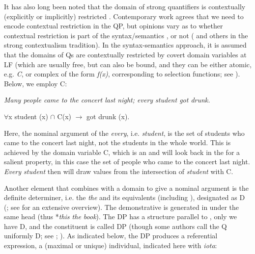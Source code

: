 \documentclass[output=paper,
modfonts
]{langscibook}
\begin{document}
It has also long been noted that the domain of strong quantifiers is contextually (explicitly or implicitly) restricted \citep[see \textit{inter alia}][]{reuland-termeulen1987}. Contemporary work agrees that we need to encode contextual restriction in the QP, but opinions vary as to whether contextual restriction is part of the syntax/semantics \citep{Partee1987, Fintel1994, vonfintel1998, stanley-szabo2000, stanley2002, matthewson2001, marti2003, Giannakidou2004, etxeberria2005, etxeberria2008, etxeberria2009, gillon2006, gillon2009, etxeberria-giannakidou2009, etxeberria-giannakidou2014, giannakidou-rathert2009}, or not (\citealt{recanati1996, recanati2004, recanati2007} and others in the strong contextualism tradition). In the syntax-semantics approach, it is  assumed that the domains of Qs are contextually restricted by covert domain variables at LF (which are usually free, but can also be bound, and they can be  either atomic, e.g. \textit{C}, or complex of the form \textit{f(x)}, corresponding to selection functions; see \citealt{vonfintel1998,stanley2002,marti2003}). Below, we employ C:

\ea\label{ex:etxeberria:2}
\textit{Many people came to the concert last night; every student got drunk.}
\z

\ea\label{ex:exteberria:3}
$\forall$x {\ob} student (x) $\cap$ C(x) {\cb} $\rightarrow$ got drunk (x).
\z

Here, the nominal argument of the  \textit{every}, i.e. \textit{student}, is the set of students who came to the concert last night, not the students in the whole world. This is achieved by the domain variable C, which is an  and will look back in the  for a salient property, in this case the set of people who came to the concert last night. \textit{Every student} then will draw values from the intersection of \textit{student} with C.

Another element that combines with a domain to give a nominal argument is the definite determiner, i.e. the  \textit{the} and its equivalents (including ), designated as D (\citealt{abney1987}; see \citealt{AlexiadouEtAlii2008} for an extensive overview). The demonstrative is generated in  under the same head (thus *\textit{this the book}). The DP has a structure parallel to , only  we have D, and the constituent is called DP (though some authors call the Q uniformly D; see \citealt{matthewson1998}; \citealt{gillon2009}). As indicated below, the DP produces a referential expression, a (maximal or unique) individual, indicated here with \textit{iota}:
\end{document}
